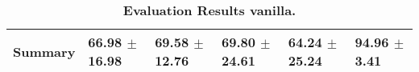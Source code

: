 \begin{table}[htb]
{\begin{tabular}{llllll}
\midrule
\textbf{Summary                                  } &                  \phantom{0}66.98 $\pm$ 16.98 &                      \phantom{0}69.58 $\pm$ 12.76 &                  \phantom{0}69.80 $\pm$ 24.61 &            \phantom{0}64.24 $\pm$ 25.24 &  \phantom{0}94.96 $\pm$ \phantom{0}3.41 \\
\bottomrule
\end{tabular}%
}
\caption{\textbf{Evaluation Results vanilla.}}
\label{tab:eval-results}
\end{table}


